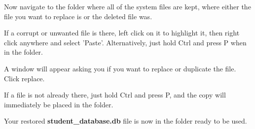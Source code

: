 
Now navigate to the folder where all of the system files are kept, where either the file you want to replace is or the deleted file was.


If a corrupt or unwanted file is there, left click on it to highlight it, then right click anywhere and select 'Paste'.  Alternatively, just hold Ctrl and press P when in the folder.


A window will appear asking you if you want to replace or duplicate the file. Click replace.


If a file is not already there, just hold Ctrl and press P, and the copy will immediately be placed in the folder.


Your restored \textbf{student\_database.db} file is now in the folder ready to be used.


